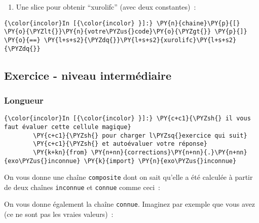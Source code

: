     \begin{enumerate}
\def\labelenumi{\arabic{enumi})}
\setcounter{enumi}{3}
\tightlist
\item
  Une slice pour obtenir ``xurolifc'' (avec deux constantes)~:
\end{enumerate}

    \begin{Verbatim}[commandchars=\\\{\}]
{\color{incolor}In [{\color{incolor} }]:} \PY{n}{chaine}\PY{p}{[} \PY{o}{\PYZlt{}}\PY{n}{votre\PYZus{}code}\PY{o}{\PYZgt{}} \PY{p}{]} \PY{o}{==} \PY{l+s+s2}{\PYZdq{}}\PY{l+s+s2}{xurolifc}\PY{l+s+s2}{\PYZdq{}}
\end{Verbatim}


    \hypertarget{exercice---niveau-intermuxe9diaire}{%
\subsection{Exercice - niveau
intermédiaire}\label{exercice---niveau-intermuxe9diaire}}

    \hypertarget{longueur}{%
\subsubsection{Longueur}\label{longueur}}

    \begin{Verbatim}[commandchars=\\\{\}]
{\color{incolor}In [{\color{incolor} }]:} \PY{c+c1}{\PYZsh{} il vous faut évaluer cette cellule magique}
        \PY{c+c1}{\PYZsh{} pour charger l\PYZsq{}exercice qui suit}
        \PY{c+c1}{\PYZsh{} et autoévaluer votre réponse}
        \PY{k+kn}{from} \PY{n+nn}{corrections}\PY{n+nn}{.}\PY{n+nn}{exo\PYZus{}inconnue} \PY{k}{import} \PY{n}{exo\PYZus{}inconnue}
\end{Verbatim}


    On vous donne une chaîne \texttt{composite} dont on sait qu'elle a été
calculée à partir de deux chaînes \texttt{inconnue} et \texttt{connue}
comme ceci~:

\begin{Shaded}
\begin{Highlighting}[]
\OperatorTok{=}\OperatorTok{+}\OperatorTok{+}
\end{Highlighting}
\end{Shaded}

    On vous donne également la chaîne \texttt{connue}. Imaginez par exemple
que vous avez (ce ne sont pas les vraies valeurs)~:

